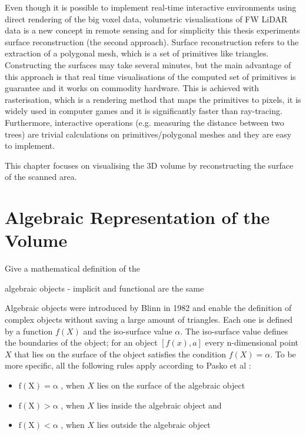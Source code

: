 \documentclass{subfiles}
\begin{document}
\par Even though it is possible to implement real-time interactive environments using direct rendering of the big voxel data, volumetric visualisations of FW LiDAR data is a new concept in remote sensing and for simplicity this thesis experiments surface reconstruction (the second approach). Surface reconstruction refers to the extraction of a polygonal mesh, which is a set of primitives like triangles. Constructing the surfaces may take several minutes, but the main advantage of this approach is that real time visualisations of the computed set of primitives is guarantee and it works on commodity hardware. This is achieved with rasterisation, which is a rendering method that maps the primitives to pixels, it is widely used in computer games and it is significantly faster than ray-tracing. Furthermore, interactive operations (e.g. measuring the distance between two trees) are trivial calculations on primitives/polygonal meshes and they are easy to implement. 

\par This chapter focuses on visualising the 3D volume by reconstructing the surface of the scanned area. 

\section{Algebraic Representation of the Volume}

Give a mathematical definition of the 

algebraic objects - implicit and functional are the same 

\par Algebraic objects were introduced by Blinn in 1982 \cite{Blinn1982} and enable the definition of complex objects without saving a large amount of triangles. Each one is defined by a function $ \mathit{f(X)} $ and the iso-surface value $\alpha$. The iso-surface value defines the boundaries of the object; for an object $ [f(x),a]$ every n-dimensional point $ \mathit{X} $  that lies on the surface of the object satisfies the condition $ \mathit{f(X)=\alpha }  $. To be more specific, all the following rules apply according to Pasko et al \cite{Pasko1994}: 
\begin{itemize}
	\item $	\mathrm{f(X) = \alpha }$ , when $X$ lies on the surface of the algebraic object
	\item $	\mathrm{f(X) > \alpha }$ , when $X$ lies inside the algebraic object and
	\item $	\mathrm{f(X) < \alpha }$ , when $X$ lies outside the algebraic object	 
\end{itemize}
\end{document}
